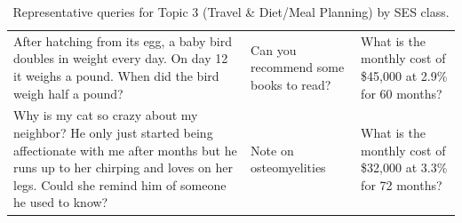 \begin{table}[ht]
\begin{tabular}{p{4.3cm}p{4.3cm}p{4.3cm}}
After hatching from its egg, a baby bird doubles in weight every day. On day 12 it weighs a pound. When did the bird weigh half a pound? & Can you recommend some books to read? & What is the monthly cost of \$45,000 at 2.9\% for 60 months? \\[4pt]
Why is my cat so crazy about my neighbor? He only just started being affectionate with me after months but he runs up to her chirping and loves on her legs.  Could she remind him of someone he used to know? & Note on osteomyelities & What is the monthly cost of \$32,000 at 3.3\% for 72 months? \\[4pt]
\bottomrule
\end{tabular}
\caption{Representative queries for Topic 3 (Travel \& Diet/Meal Planning) by SES class.}
\label{tab:repr_queries_topic3}
\end{table}
